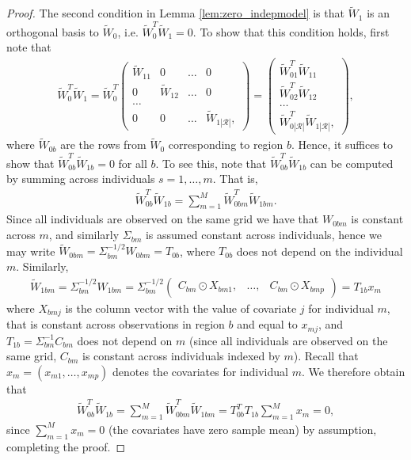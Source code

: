 \begin{proof}
The second condition in Lemma \ref{lem:zero_indepmodel} is that $\widetilde{W}_1$ is an orthogonal basis to $\widetilde{W}_0$, i.e. $\widetilde{W}_0^T \widetilde{W}_1= 0$. To show that this condition holds, first note that
\begin{align}
 \widetilde{W}_0^T \widetilde{W}_1
=
\widetilde{W}_0^T
\begin{pmatrix} 
\widetilde{W}_{11} & 0 & \ldots &  0 \\
0 & \widetilde{W}_{12} & \ldots & 0 \\
\ldots & & & \\
0 & 0 & \ldots & \widetilde{W}_{1|\mathcal{R}|},
\end{pmatrix}
=
\begin{pmatrix} 
\widetilde{W}_{01}^T \widetilde{W}_{11} \\
\widetilde{W}_{02}^T \widetilde{W}_{12} \\
\ldots \\
\widetilde{W}_{0|\mathcal{R}|}^T \widetilde{W}_{1|\mathcal{R}|},
\end{pmatrix},
\nonumber
\end{align}
where $\widetilde{W}_{0b}$ are the rows from $\widetilde{W}_0$ corresponding to region $b$.
Hence, it suffices to show that $\widetilde{W}_{0b}^T \widetilde{W}_{1b}=0$ for all $b$.
To see this, note that $\widetilde{W}_{0b}^T \widetilde{W}_{1b}$ can be computed by summing across individuals $s=1,\ldots,m$. That is,
\begin{align}
 \widetilde{W}_{0b}^T \widetilde{W}_{1b}
=\sum_{m=1}^M  \widetilde{W}_{0bm}^T \widetilde{W}_{1bm}.
\nonumber
\end{align}
Since all individuals are observed on the same grid we have that $W_{0bm}$ is constant across $m$, and similarly $\Sigma_{bm}$ is assumed constant across individuals, hence we may write $\widetilde{W}_{0bm}= \Sigma_{bm}^{-1/2} W_{0bm}= T_{0b}$, where $T_{0b}$ does not depend on the individual $m$.
Similarly, 
\begin{align}
\widetilde{W}_{1bm}= \Sigma_{bm}^{-1/2} W_{1bm}=
\Sigma_{bm}^{-1/2} \begin{pmatrix} C_{bm} \odot X_{bm 1}, & \ldots, & C_{bm} \odot X_{bm p} \end{pmatrix} 
= T_{1b} x_m
\nonumber
\end{align}
where $X_{b m j}$ is the column vector with the value of covariate $j$ for individual $m$, that is constant across observations in region $b$ and equal to $x_{mj}$,
and $T_{1b}= \Sigma_{bm}^{-1} C_{bm}$ does not depend on $m$ (since all individuals are observed on the same grid, $C_{bm}$ is constant across individuals indexed by $m$). Recall that $x_m= (x_{m1},\ldots,x_{mp})$ denotes the covariates for individual $m$.
We therefore obtain that
\begin{align}
 \widetilde{W}_{0b}^T \widetilde{W}_{1b}
=\sum_{m=1}^M  \widetilde{W}_{0bm}^T \widetilde{W}_{1bm}=
T_{0b}^T T_{1b} \sum_{m=1}^M x_m= 0,
\nonumber
\end{align}
since $\sum_{m=1}^M x_m=0$ (the covariates have zero sample mean) by assumption, completing the proof.

\end{proof}




